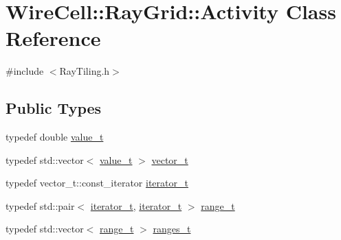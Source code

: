 \hypertarget{class_wire_cell_1_1_ray_grid_1_1_activity}{}\section{Wire\+Cell\+:\+:Ray\+Grid\+:\+:Activity Class Reference}
\label{class_wire_cell_1_1_ray_grid_1_1_activity}


{\ttfamily \#include $<$Ray\+Tiling.\+h$>$}

\subsection*{Public Types}
\begin{DoxyCompactItemize}
\item 
typedef double \hyperlink{class_wire_cell_1_1_ray_grid_1_1_activity_a19d09025219df912a8f57910468b4017}{value\+\_\+t}
\item 
typedef std\+::vector$<$ \hyperlink{class_wire_cell_1_1_ray_grid_1_1_activity_a19d09025219df912a8f57910468b4017}{value\+\_\+t} $>$ \hyperlink{class_wire_cell_1_1_ray_grid_1_1_activity_af39e49aa9b463dc4f10271e0da7245a8}{vector\+\_\+t}
\item 
typedef vector\+\_\+t\+::const\+\_\+iterator \hyperlink{class_wire_cell_1_1_ray_grid_1_1_activity_a4e6dc9c676d517a5819962b10a2638fe}{iterator\+\_\+t}
\item 
typedef std\+::pair$<$ \hyperlink{class_wire_cell_1_1_ray_grid_1_1_activity_a4e6dc9c676d517a5819962b10a2638fe}{iterator\+\_\+t}, \hyperlink{class_wire_cell_1_1_ray_grid_1_1_activity_a4e6dc9c676d517a5819962b10a2638fe}{iterator\+\_\+t} $>$ \hyperlink{class_wire_cell_1_1_ray_grid_1_1_activity_af70e5851ae6fb8d76415033c0f90cb3e}{range\+\_\+t}
\item 
typedef std\+::vector$<$ \hyperlink{class_wire_cell_1_1_ray_grid_1_1_activity_af70e5851ae6fb8d76415033c0f90cb3e}{range\+\_\+t} $>$ \hyperlink{class_wire_cell_1_1_ray_grid_1_1_activity_ac1614e7c72c06f7be7c03a80a25b024b}{ranges\+\_\+t}
\end{DoxyCompactItemize}
